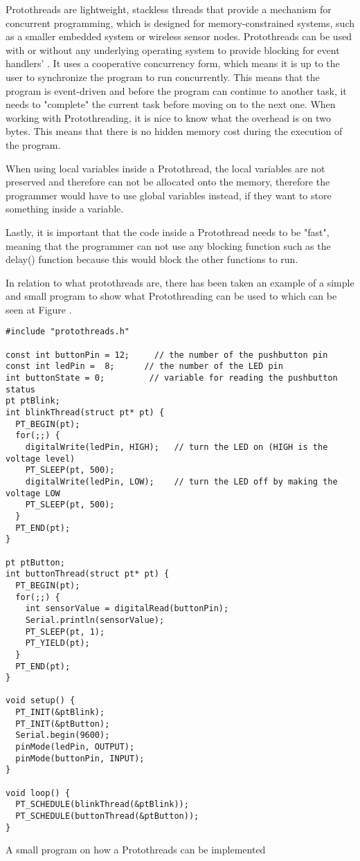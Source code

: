 Protothreads are lightweight, stackless threads that provide a mechanism for concurrent programming, which is designed for memory-constrained systems, such as a smaller embedded system or wireless sensor nodes. Protothreads can be used with or without any underlying operating system to provide blocking for event handlers'
\cite{AdamDunkelProtothreads}. It uses a cooperative concurrency form, which means it is up to the user to synchronize the program to run concurrently. This means that the program is event-driven and before the program can continue to another task, it needs to "complete" the current task before moving on to the next one.
When working with Protothreading, it is nice to know what the overhead is on two bytes. This means that there is no hidden memory cost during the execution of the program. 

When using local variables inside a Protothread, the local variables are not preserved and therefore can not be allocated onto the memory, therefore the programmer would have to use global variables instead, if they want to store something inside a variable.

Lastly, it is important that the code inside a Protothread needs to be "fast", meaning that the programmer can not use any blocking function such as the delay() function because this would block the other functions to run. \cite{AdamDunkelProtothreads}

In relation to what protothreads are, there has been taken an example of a simple and small program to show what Protothreading can be used to which can be seen at Figure  \cite{ArduinoProtothreadsTutorial2019}.

\begin{listing}[htb!]
\centering
\begin{verbatim}
#include "protothreads.h"

const int buttonPin = 12;     // the number of the pushbutton pin
const int ledPin =  8;      // the number of the LED pin
int buttonState = 0;         // variable for reading the pushbutton status
pt ptBlink;
int blinkThread(struct pt* pt) {
  PT_BEGIN(pt);
  for(;;) {
    digitalWrite(ledPin, HIGH);   // turn the LED on (HIGH is the voltage level)
    PT_SLEEP(pt, 500);
    digitalWrite(ledPin, LOW);    // turn the LED off by making the voltage LOW
    PT_SLEEP(pt, 500);
  }
  PT_END(pt);
}

pt ptButton;
int buttonThread(struct pt* pt) {
  PT_BEGIN(pt);
  for(;;) {
    int sensorValue = digitalRead(buttonPin);
    Serial.println(sensorValue);
    PT_SLEEP(pt, 1);
    PT_YIELD(pt);
  }
  PT_END(pt);
}

void setup() {
  PT_INIT(&ptBlink);
  PT_INIT(&ptButton);
  Serial.begin(9600);
  pinMode(ledPin, OUTPUT);
  pinMode(buttonPin, INPUT);
}

void loop() {
  PT_SCHEDULE(blinkThread(&ptBlink));
  PT_SCHEDULE(buttonThread(&ptButton));
}
\end{verbatim}
\caption{A small program on how a Protothreads can be implemented}
\label{List: Protothreads example}
\end{listing}

